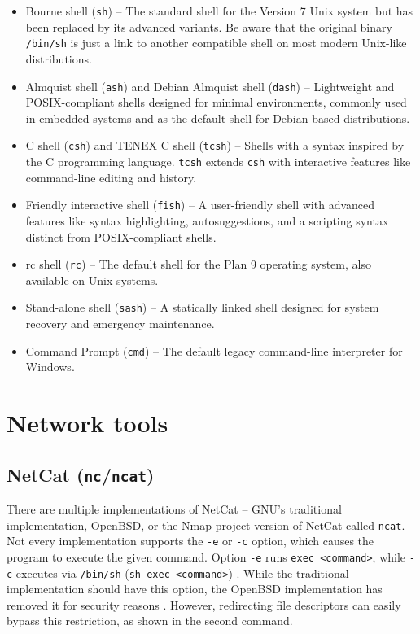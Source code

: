 \begin{itemize}
\item Bourne shell (\texttt{sh}) -- The standard shell for the Version 7 Unix system but has been replaced by its advanced variants. Be aware that the original binary \texttt{/bin/sh} is just a link to another compatible shell on most modern Unix-like distributions.
\item Almquist shell (\texttt{ash}) and Debian Almquist shell (\texttt{dash}) -- Lightweight and POSIX-compliant shells designed for minimal environments, commonly used in embedded systems and as the default shell for Debian-based distributions.
\item C shell (\texttt{csh}) and TENEX C shell (\texttt{tcsh}) -- Shells with a syntax inspired by the C programming language. \texttt{tcsh} extends \texttt{csh} with interactive features like command-line editing and history.
\item Friendly interactive shell (\texttt{fish}) -- A user-friendly shell with advanced features like syntax highlighting, autosuggestions, and a scripting syntax distinct from POSIX-compliant shells.
\item rc shell (\texttt{rc}) -- The default shell for the Plan 9 operating system, also available on Unix systems.
\item Stand-alone shell (\texttt{sash}) -- A statically linked shell designed for system recovery and emergency maintenance.
\item Command Prompt (\texttt{cmd}) -- The default legacy command-line interpreter for Windows.
\end{itemize}


\section{Network tools}

\subsection{NetCat (\texttt{nc}/\texttt{ncat})}

There are multiple implementations of NetCat -- GNU's traditional implementation, OpenBSD, or the Nmap project version of NetCat called \texttt{ncat}. Not every implementation supports the \texttt{-e} or \texttt{-c} option, which causes the program to execute the given command. Option \texttt{-e} runs \texttt{exec <command>}, while \texttt{-c} executes via \texttt{/bin/sh} (\texttt{sh-exec <command>}) \cite{ncat-man}. While the traditional implementation should have this option, the OpenBSD implementation has removed it for security reasons \cite{nc-man}. However, redirecting file descriptors can easily bypass this restriction, as shown in the second command.


